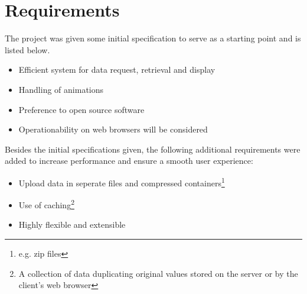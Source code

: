 \chapter{Requirements}
\label{sec:requirements}
The project was given some initial specification to serve as a starting point and is listed below.
\begin{itemize}
\item Efficient system for data request, retrieval and display
\item Handling of animations
\item Preference to open source software 
\item Operationability on web browsers will be considered
\end{itemize}

Besides the initial specifications given, the following additional requirements were added to increase performance and ensure a smooth user experience:
\begin{itemize}
\item Upload data in seperate files and compressed containers\footnote{e.g. zip files}
\item Use of caching\footnote{A collection of data duplicating original values stored on the server or by the client's web browser}
\item Highly flexible and extensible
\end{itemize}